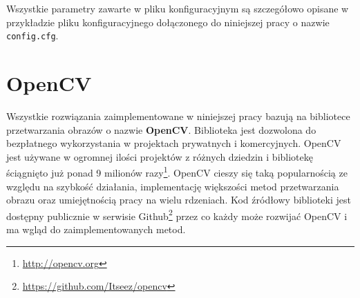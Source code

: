 Wszystkie parametry zawarte w pliku konfiguracyjnym są szczegółowo opisane w przykładzie pliku konfiguracyjnego dołączonego do niniejszej pracy o nazwie \texttt{config.cfg}.

\section{OpenCV}
\label{sec:oprogramowanie:opencv}

Wszystkie rozwiązania zaimplementowane w niniejszej pracy bazują na bibliotece przetwarzania obrazów o nazwie \textbf{OpenCV}. Biblioteka jest dozwolona do bezpłatnego wykorzystania w projektach prywatnych i komercyjnych. OpenCV jest używane w ogromnej ilości projektów z różnych dziedzin i bibliotekę ściągnięto już ponad 9 milionów razy\footnote{\url{http://opencv.org}}. OpenCV cieszy się taką popularnością ze względu na szybkość działania, implementację większości metod przetwarzania obrazu oraz umiejętnością pracy na wielu rdzeniach. Kod źródłowy biblioteki jest dostępny publicznie w serwisie Github\footnote{\url{https://github.com/Itseez/opencv}} przez co każdy może rozwijać OpenCV i ma wgląd do zaimplementowanych metod.
